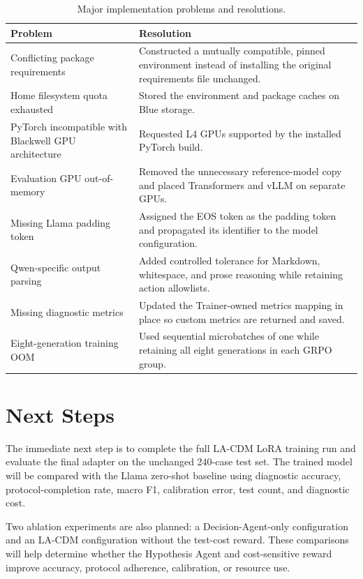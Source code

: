 \documentclass[11pt]{article}
\begin{document}
\begin{table}[ht]
    \centering
    \caption{Major implementation problems and resolutions.}
    \label{tab:problems}
    \begin{tabular}{>{\raggedright\arraybackslash}p{}
                    >{\raggedright\arraybackslash}p{}}
        \toprule
        Problem & Resolution \\
        \midrule
        Conflicting package requirements & Constructed a mutually compatible,
        pinned environment instead of installing the original requirements
        file unchanged. \\
        Home filesystem quota exhausted & Stored the environment and package
        caches on Blue storage. \\
        PyTorch incompatible with Blackwell GPU architecture & Requested L4
        GPUs supported by the installed PyTorch build. \\
        Evaluation GPU out-of-memory & Removed the unnecessary reference-model
        copy and placed Transformers and vLLM on separate GPUs. \\
        Missing Llama padding token & Assigned the EOS token as the padding
        token and propagated its identifier to the model configuration. \\
        Qwen-specific output parsing & Added controlled tolerance for Markdown,
        whitespace, and prose reasoning while retaining action allowlists. \\
        Missing diagnostic metrics & Updated the Trainer-owned metrics mapping
        in place so custom metrics are returned and saved. \\
        Eight-generation training OOM & Used sequential microbatches of one
        while retaining all eight generations in each GRPO group. \\
        \bottomrule
    \end{tabular}
\end{table}

\section{Next Steps}

The immediate next step is to complete the full LA-CDM LoRA training run and
evaluate the final adapter on the unchanged 240-case test set. The trained
model will be compared with the Llama zero-shot baseline using diagnostic
accuracy, protocol-completion rate, macro F1, calibration error, test count,
and diagnostic cost.

Two ablation experiments are also planned: a Decision-Agent-only configuration
and an LA-CDM configuration without the test-cost reward. These comparisons
will help determine whether the Hypothesis Agent and cost-sensitive reward
improve accuracy, protocol adherence, calibration, or resource use.
\end{document}
